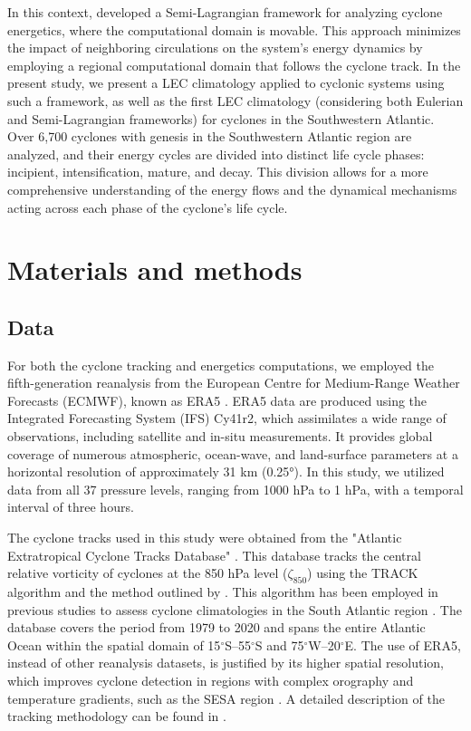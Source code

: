 \documentclass[pdflatex,sn-chicago]{sn-jnl}%
\theoremstyle{plain}
\theoremstyle{definition}
\theoremstyle{remark}
\theoremstyle{definition}
\begin{document}
In this context, \citet{michaelides1999quasi} developed a Semi-Lagrangian framework for analyzing cyclone energetics, where the computational domain is movable. This approach minimizes the impact of neighboring circulations on the system's energy dynamics by employing a regional computational domain that follows the cyclone track. In the present study, we present a LEC climatology applied to cyclonic systems using such a framework, as well as the first LEC climatology (considering both Eulerian and Semi-Lagrangian frameworks) for cyclones in the Southwestern Atlantic. Over 6,700 cyclones with genesis in the Southwestern Atlantic region are analyzed, and their energy cycles are divided into distinct life cycle phases: incipient, intensification, mature, and decay. This division allows for a more comprehensive understanding of the energy flows and the dynamical mechanisms acting across each phase of the cyclone's life cycle.

\section{Materials and methods}

\subsection{Data}\label{sec:data}

For both the cyclone tracking and energetics computations, we employed the fifth-generation reanalysis from the European Centre for Medium-Range Weather Forecasts (ECMWF), known as ERA5 \citep{hersbach2020era5}. ERA5 data are produced using the Integrated Forecasting System (IFS) Cy41r2, which assimilates a wide range of observations, including satellite and in-situ measurements. It provides global coverage of numerous atmospheric, ocean-wave, and land-surface parameters at a horizontal resolution of approximately 31 km (0.25°). In this study, we utilized data from all 37 pressure levels, ranging from 1000 hPa to 1 hPa, with a temporal interval of three hours.

The cyclone tracks used in this study were obtained from the "Atlantic Extratropical Cyclone Tracks Database" \citep{gramcianinov2020data}. This database tracks the central relative vorticity of cyclones at the 850 hPa level (\(\zeta_{850}\)) using the TRACK algorithm \citep{hodges1994general, hodges1995feature} and the method outlined by \citet{hoskins2002new}. This algorithm has been employed in previous studies to assess cyclone climatologies in the South Atlantic region \citep{gramcianinov2019properties,gramcianinov2020analysis,couto2024new}. The database covers the period from 1979 to 2020 and spans the entire Atlantic Ocean within the spatial domain of 15\(^\circ\)S–55\(^\circ\)S and 75\(^\circ\)W–20\(^\circ\)E. The use of ERA5, instead of other reanalysis datasets, is justified by its higher spatial resolution, which improves cyclone detection in regions with complex orography and temperature gradients, such as the SESA region \citep{gramcianinov2020analysis}. A detailed description of the tracking methodology can be found in \citet{gramcianinov2020analysis}.
\end{document}
